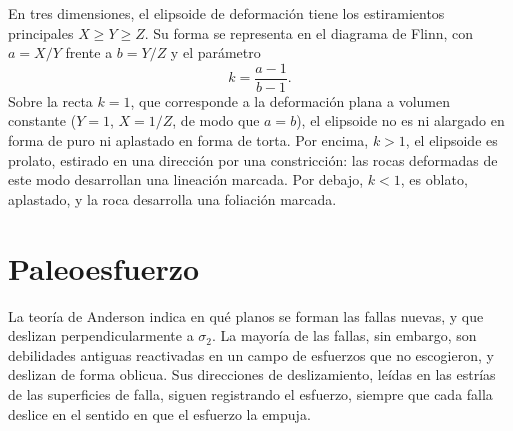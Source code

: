 En tres dimensiones, el elipsoide de deformación tiene los estiramientos principales $X \ge Y
\ge Z$. Su forma se representa en el diagrama de Flinn, con $a = X/Y$ frente a $b =
Y/Z$ y el parámetro
\[
  k = \frac{a - 1}{b - 1} .
\]
Sobre la recta $k = 1$, que corresponde a la deformación plana a volumen constante ($Y = 1$,
$X = 1/Z$, de modo que $a = b$), el elipsoide no es ni alargado en forma de puro ni aplastado en forma de torta. Por encima,
$k > 1$, el elipsoide es prolato, estirado en una dirección por una
constricción: las rocas deformadas de este modo desarrollan una lineación marcada. Por debajo, $k < 1$,
es oblato, aplastado, y la roca desarrolla una foliación marcada.

\begin{omfigure}

\par{}\label{fig:b3:structural-analysis:flinn}
\end{omfigure}

\section{Paleoesfuerzo}\label{sec:b3:structural-analysis:palaeostress}

La teoría de Anderson indica en qué planos se forman las fallas nuevas, y que deslizan
perpendicularmente a $\sigma_2$. La mayoría de las fallas, sin embargo, son debilidades antiguas
reactivadas en un campo de esfuerzos que no escogieron, y deslizan
de forma oblicua. Sus direcciones de deslizamiento, leídas en las estrías de las superficies de falla,
siguen registrando el esfuerzo, siempre que cada falla deslice en el sentido en que el esfuerzo
la empuja.

